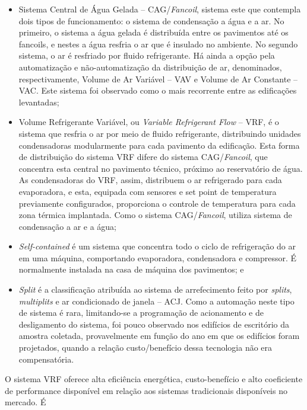 \begin{itemize}
    \item Sistema Central de Água Gelada – CAG/\textit{Fancoil}, sistema este que contempla dois 
    tipos de funcionamento: o sistema de condensação a água e a ar. No primeiro, o 
    sistema a água gelada é distribuída entre os pavimentos até os fancoils, e nestes a 
    água resfria o ar que é insulado no ambiente. No segundo sistema, o ar é resfriado 
    por fluido refrigerante. Há ainda a opção pela automatização e não-automatização da 
    distribuição de ar, denominados, respectivamente, Volume de Ar Variável – VAV e 
    Volume de Ar Constante – VAC. Este sistema foi observado como o mais recorrente entre 
    as edificações levantadas;
    \item Volume Refrigerante Variável, ou \textit{Variable Refrigerant Flow} – VRF, é o sistema 
    que resfria o ar por meio de fluido refrigerante, distribuindo unidades condensadoras 
    modularmente para cada pavimento da edificação. Esta forma de distribuição do sistema 
    VRF difere do sistema CAG/\textit{Fancoil}, que concentra esta central no pavimento técnico, 
    próximo ao reservatório de água. As condensadoras do VRF, assim, distribuem o ar 
    refrigerado para cada evaporadora, e esta, equipada com sensores e set point de 
    temperatura previamente configurados, proporciona o controle de temperatura para cada 
    zona térmica implantada. Como o sistema CAG/\textit{Fancoil}, utiliza sistema de condensação 
    a ar e a água;
    \item \textit{Self-contained} é um sistema que concentra todo o ciclo de refrigeração do ar 
    em uma máquina, comportando evaporadora, condensadora e compressor. É normalmente 
    instalada na casa de máquina dos pavimentos; e
    \item \textit{Split} é a classificação atribuída ao sistema de arrefecimento feito por \textit{splits}, 
    \textit{multiplits} e ar condicionado de janela – ACJ. Como a automação neste tipo de sistema é 
    rara, limitando-se a programação de acionamento e de desligamento do sistema, foi pouco 
    observado nos edifícios de escritório da amostra coletada, provavelmente em função do 
    ano em que os edifícios foram projetados, quando a relação custo/benefício dessa 
    tecnologia não era compensatória.
\end{itemize}
O sistema VRF oferece alta eficiência energética, custo-benefício e alto coeficiente de 
performance disponível em relação aos sistemas tradicionais disponíveis no mercado. É 
